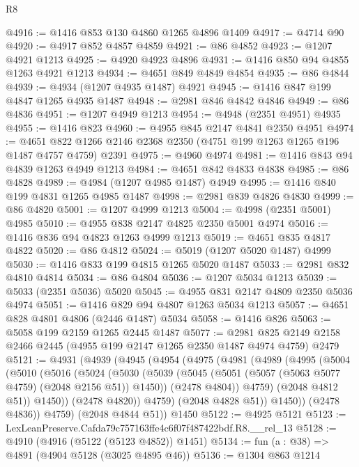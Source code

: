 \begin{lexlean}{R8}
\begin{coremodule}
@4916 := @1416 @853 @130 @4860 @1265 @4896 @1409
@4917 := @4714 @90
@4920 := @4917 @852 @4857 @4859
@4921 := @86 @4852
@4923 := @1207 @4921 @1213
@4925 := @4920 @4923 @4896
@4931 := @1416 @850 @94 @4855 @1263 @4921 @1213
@4934 := @4651 @849 @4849 @4854
@4935 := @86 @4844
@4939 := @4934 (@1207 @4935 @1487) @4921
@4945 := @1416 @847 @199 @4847 @1265 @4935 @1487
@4948 := @2981 @846 @4842 @4846
@4949 := @86 @4836
@4951 := @1207 @4949 @1213
@4954 := @4948 (@2351 @4951) @4935
@4955 := @1416 @823
@4960 := @4955 @845 @2147 @4841 @2350 @4951
@4974 := @4651 @822 @1266 @2146 @2368 @2350 (@4751 @199 @1263 @1265 @196 @1487 @4757 @4759) @2391
@4975 := @4960 @4974
@4981 := @1416 @843 @94 @4839 @1263 @4949 @1213
@4984 := @4651 @842 @4833 @4838
@4985 := @86 @4828
@4989 := @4984 (@1207 @4985 @1487) @4949
@4995 := @1416 @840 @199 @4831 @1265 @4985 @1487
@4998 := @2981 @839 @4826 @4830
@4999 := @86 @4820
@5001 := @1207 @4999 @1213
@5004 := @4998 (@2351 @5001) @4985
@5010 := @4955 @838 @2147 @4825 @2350 @5001 @4974
@5016 := @1416 @836 @94 @4823 @1263 @4999 @1213
@5019 := @4651 @835 @4817 @4822
@5020 := @86 @4812
@5024 := @5019 (@1207 @5020 @1487) @4999
@5030 := @1416 @833 @199 @4815 @1265 @5020 @1487
@5033 := @2981 @832 @4810 @4814
@5034 := @86 @4804
@5036 := @1207 @5034 @1213
@5039 := @5033 (@2351 @5036) @5020
@5045 := @4955 @831 @2147 @4809 @2350 @5036 @4974
@5051 := @1416 @829 @94 @4807 @1263 @5034 @1213
@5057 := @4651 @828 @4801 @4806 (@2446 @1487) @5034
@5058 := @1416 @826
@5063 := @5058 @199 @2159 @1265 @2445 @1487
@5077 := @2981 @825 @2149 @2158 @2466 @2445 (@4955 @199 @2147 @1265 @2350 @1487 @4974 @4759) @2479
@5121 := @4931
    (@4939
      (@4945
        (@4954
          (@4975
            (@4981
              (@4989
                (@4995
                  (@5004
                    (@5010
                      (@5016
                        (@5024
                          (@5030
                            (@5039
                              (@5045 (@5051 (@5057 (@5063 @5077 @4759) (@2048 @2156 @51)) @1450))
                              (@2478 @4804))
                            @4759)
                          (@2048 @4812 @51))
                        @1450))
                    (@2478 @4820))
                  @4759)
                (@2048 @4828 @51))
              @1450))
          (@2478 @4836))
        @4759)
      (@2048 @4844 @51))
    @1450
@5122 := @4925 @5121
@5123 := LexLeanPreserve.Cafda79c757163ffe4c6f07f487422bdf.R8.__rel_13
@5128 := @4910 (@4916 (@5122 (@5123 @4852)) @1451)
@5134 := fun (a : @38) => @4891 (@4904 @5128 (@3025 @4895 @46))
@5136 := @1304 @863 @1214

\end{coremodule}
\end{lexlean}
